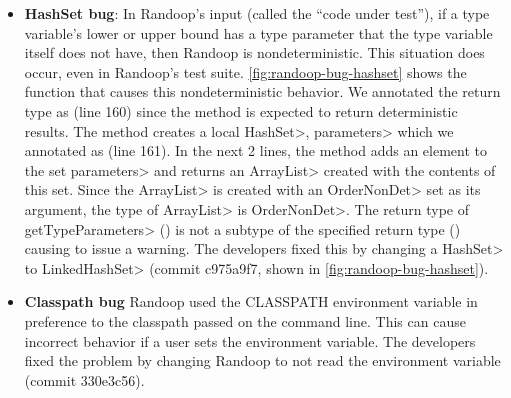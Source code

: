 \begin{itemize}
    \item
    \textbf{HashSet bug}: In Randoop's input (called the ``code under test''),
    if a type variable's lower or upper
    bound has a type parameter that the type variable itself does not have,
    then Randoop is nondeterministic.
    This situation does occur, even in Randoop's test suite.
    \cref{fig:randoop-bug-hashset} shows the function that causes this nondeterministic behavior.
    We annotated the return type as  (line 160) since the method 
    is expected to return deterministic results. The method creates a local \<HashSet>, \<parameters> 
    which we annotated as  (line 161). In the next 2 lines,
    the method adds an element to the set \<parameters> and returns an \<ArrayList> created with the
    contents of this set. Since the \<ArrayList> is created with an \<OrderNonDet> set as
    its argument, the type of \<ArrayList> is \<OrderNonDet>. The return type of \<getTypeParameters> 
    () is not a subtype of the specified return type 
    () causing \theDeterminismChecker to issue a warning.
    The developers fixed this by changing a \<HashSet> to \<LinkedHashSet>
    (commit c975a9f7, shown in \cref{fig:randoop-bug-hashset}).
    
    
    
    \item
    \textbf{Classpath bug}
    Randoop used the CLASSPATH environment variable in preference to the
    classpath passed on the command line.
    This can cause incorrect behavior
    if a user sets the environment variable.
    The developers fixed the problem by changing Randoop to not read the environment variable
    (commit 330e3c56).
\end{itemize}




